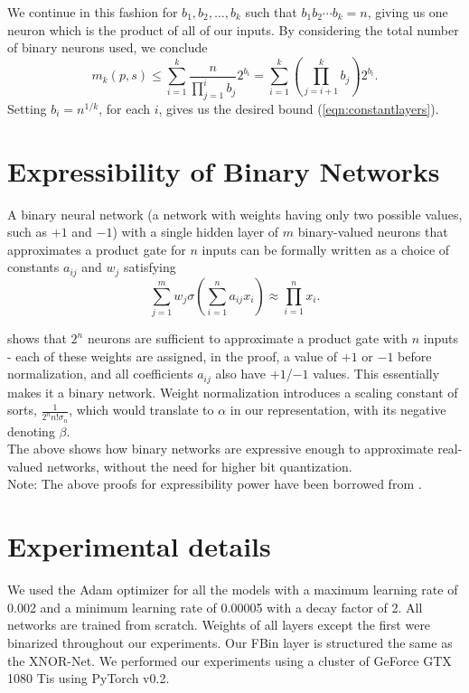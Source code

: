 We continue in this fashion for $b_1, b_2, \ldots, b_k$ such that $b_1b_2\cdots b_k = n$, giving us one neuron which is the product of all of our inputs.  By considering the total number of binary neurons used, we conclude
\begin{equation}
m_k(p, s) \le \sum_{i = 1}^k \frac{n}{\prod_{j = 1}^i b_j} 2^{b_i} = \sum_{i = 1}^k \left(\prod_{j = {i + 1}}^k b_j\right) 2^{b_i}.
\label{eqn:branching}
\end{equation}
Setting $b_i = n^{1/k}$, for each $i$, gives us the desired bound (\ref{eqn:constantlayers}).

\section{Expressibility of Binary Networks}
\noindent A binary neural network (a network with weights having only two possible values, such as $+1$ and $-1$) with a single hidden layer of $m$ binary-valued neurons that approximates a product gate for $n$ inputs can be formally written as a choice of constants $a_{ij}$ and $w_j$ satisfying
\begin{equation}
\sum_{j=1}^m w_j \sigma\left(\sum_{i=1}^n a_{ij} x_i\right) \approx \prod_{i=1}^n x_i. \label{goal}
\end{equation}

\noindent \cite{lin2017does} shows that $2^n$ neurons are sufficient to approximate a product gate with $n$ inputs - each of these weights are assigned, in the proof, a value of $+1$ or $-1$ before normalization, and all coefficients $a_{ij}$ also have $+1$/$-1$ values. This essentially makes it a binary network. Weight normalization introduces a scaling constant of sorts, $\frac{1}{2^{n}n!\sigma_{n}}$, which would translate to $\alpha$ in our representation, with its negative denoting $\beta$. \\
The above shows how binary networks are expressive enough to approximate real-valued networks, without the need for higher bit quantization.\\

\noindent Note: The above proofs for expressibility power have been borrowed from \cite{lin2017does}. 
\section{Experimental details}
\noindent We used the Adam optimizer for all the models with a maximum learning rate of 0.002 and a minimum learning rate of 0.00005 with a decay factor of 2. All networks are trained from scratch. Weights of all layers except the first were binarized throughout our experiments. Our FBin layer is structured the same as the XNOR-Net. We performed our experiments using a cluster of GeForce GTX 1080 Tis using PyTorch v0.2. 

